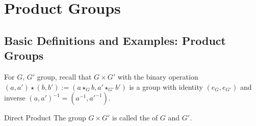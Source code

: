 \documentclass[12pt, a4paper, twoside, openright, titlepage]{book}
\begin{document}
\chapter{\textsection\textsection Product Groups}


\section{\textsection Basic Definitions and Examples: Product Groups}

\begin{rec}{}{}
        For $G$, $G'$ group, recall that $G \times G'$ with the binary operation $(a,a') \star (b,b') := (a\star_G b, a' \star_{G'} b')$ is a group with identity $(e_G, e_{G'})$ and inverse $(a,a')^{-1} = (a^{-1},{a'}^{-1})$.
\end{rec}


\begin{defn}{Direct Product}{}
        The group $G \times G'$ is called the  of $G$ and $G'$.
\end{defn}
\end{document}
